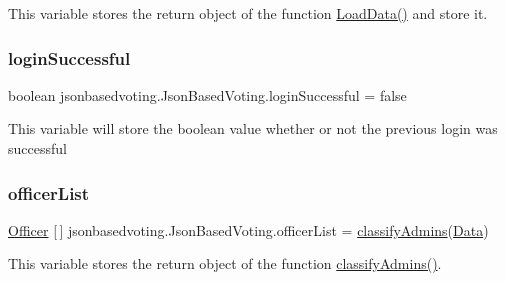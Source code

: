 This variable stores the return object of the function \mbox{\hyperlink{classjsonbasedvoting_1_1_json_based_voting_adbcb2c2a084932df90996c7199251579}{Load\+Data()}} and store it. \mbox{\label{classjsonbasedvoting_1_1_json_based_voting_af94e2555dca7bed41989b965a179a769}} 
\subsubsection{\texorpdfstring{loginSuccessful}{loginSuccessful}}
{\footnotesize\ttfamily boolean jsonbasedvoting.\+Json\+Based\+Voting.\+login\+Successful = false\hspace{0.3cm}{\ttfamily [static]}}

This variable will store the boolean value whether or not the previous login was successful \mbox{\label{classjsonbasedvoting_1_1_json_based_voting_a727f0bdc690e796c13428b4448be9456}} 
\subsubsection{\texorpdfstring{officerList}{officerList}}
{\footnotesize\ttfamily \mbox{\hyperlink{classjsonbasedvoting_1_1_officer}{Officer}} \mbox{[}$\,$\mbox{]} jsonbasedvoting.\+Json\+Based\+Voting.\+officer\+List = \mbox{\hyperlink{classjsonbasedvoting_1_1_json_based_voting_a8ae3b015105859acfa80cfcf3e481174}{classify\+Admins}}(\mbox{\hyperlink{classjsonbasedvoting_1_1_json_based_voting_a2450ce5604c5512836d2739373c6245e}{Data}})\hspace{0.3cm}{\ttfamily [static]}}

This variable stores the return object of the function \mbox{\hyperlink{classjsonbasedvoting_1_1_json_based_voting_a8ae3b015105859acfa80cfcf3e481174}{classify\+Admins()}}. \mbox{\label{classjsonbasedvoting_1_1_json_based_voting_a560cc9720f1a7101b2e1cbdf2bbe7b76}} 
